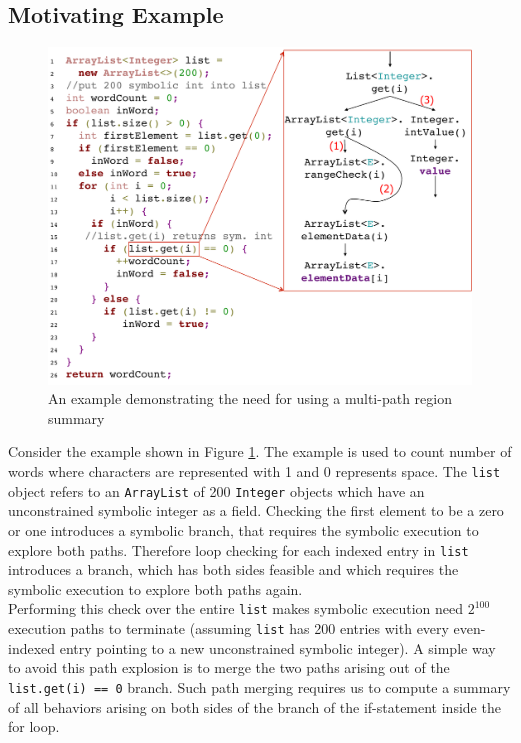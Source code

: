 \subsection{Motivating Example}
\begin{figure}
    \includegraphics[width=\columnwidth]{figures/wordCount-1.pdf}
    \caption{An example demonstrating the need for using a multi-path region summary}
    \label{fig:mot-example}
\end{figure}
Consider the example shown in Figure \ref{fig:mot-example}. The example is used to count number of words where characters are represented with 1 and 0 represents space.
%
The {\tt list} object refers to an {\tt ArrayList} of 200 {\tt Integer} objects which have an unconstrained symbolic
integer as a field. Checking the first element to be a zero or one introduces a symbolic branch, that requires the symbolic execution to explore both paths. Therefore loop checking for each indexed entry in {\tt list} introduces a branch, which has both sides feasible and which requires the symbolic execution to explore both paths again. \\
%
Performing this check over the entire {\tt list} makes symbolic execution need $2^{100}$ execution paths to terminate
(assuming {\tt list} has 200 entries with every even-indexed entry pointing to a new unconstrained symbolic integer).
%
A simple way to avoid this path explosion is to merge the two paths arising out of the {\tt list.get(i) == 0} branch.
%
Such path merging requires us to compute a summary of all behaviors arising on both sides of the branch of the if-statement inside the for loop.
